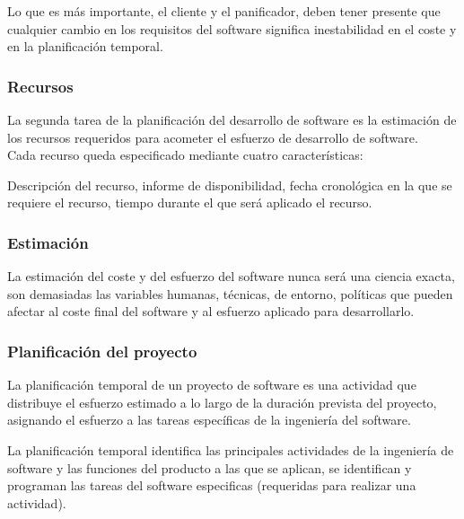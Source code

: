 \documentclass[12pt,twoside]{article}
\begin{document}
Lo que es más importante, el cliente y el panificador, deben tener presente que 
cualquier cambio en los requisitos del software significa inestabilidad en el coste 
y en la planificación temporal.\\
\subsubsection{Recursos}
La segunda tarea de la planificación del desarrollo de software es la estimación de 
los recursos requeridos para acometer el esfuerzo de desarrollo de software.\\
Cada recurso queda especificado mediante cuatro características:

Descripción del recurso, informe de disponibilidad, fecha cronológica en la que se
requiere el recurso, tiempo durante el que será aplicado el recurso.
\subsubsection{Estimación}
La estimación del coste y del esfuerzo del software nunca será una ciencia exacta, 
son demasiadas las variables humanas, técnicas, de entorno, políticas que pueden 
afectar al coste final del software y al esfuerzo aplicado para desarrollarlo.
\subsubsection{Planificación del proyecto}
La planificación temporal de un proyecto de software es una actividad que distribuye 
el esfuerzo estimado a lo largo de la duración prevista del proyecto, asignando el 
esfuerzo a las tareas específicas de la ingeniería del software.

La planificación temporal identifica las principales actividades de la ingeniería de 
software y las funciones del producto a las que se aplican, se identifican y 
programan las tareas del software especificas (requeridas para realizar una actividad).
\end{document}
